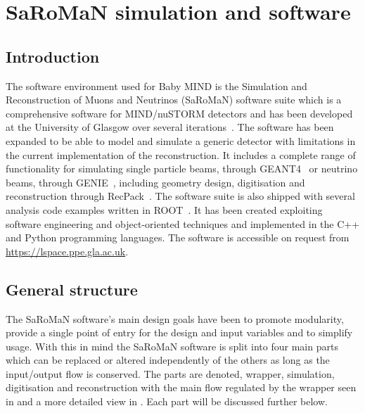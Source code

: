 \chapter{SaRoMaN simulation and software}
\label{c:software}

\section{Introduction}

The software environment used for Baby MIND is the Simulation and Reconstruction of Muons and Neutrinos (SaRoMaN) software suite which is a comprehensive software for MIND/nuSTORM detectors and has been developed at the University of Glasgow over several iterations~\cite{27Bross,  53Laing, 54NUFACT2016Hallsjo}. The software has been expanded to be able to model and simulate a generic detector with limitations in the current implementation of the reconstruction. It includes a complete range of functionality for simulating single particle beams, through GEANT4~\cite{Geant4} or neutrino beams, through GENIE~\cite{Genie}, including geometry design, digitisation and reconstruction through RecPack~\cite{RecPack}. The software suite is also shipped with several analysis code examples written in ROOT~\cite{Root}. It has been created exploiting software engineering and object-oriented techniques and implemented in the C++ and Python programming languages. The software is accessible on request from \url{https://lspace.ppe.gla.ac.uk}. 

\section{General structure}
The SaRoMaN software's main design goals have been to promote modularity, provide a single point of entry for the design and input variables and to simplify usage. With this in mind the SaRoMaN software is split into four main parts which can be replaced or altered independently of the others as long as the input/output flow is conserved. The parts are denoted, wrapper, simulation, digitisation and reconstruction with the main flow regulated by the wrapper seen in  and a more detailed view in . Each part will be discussed further below.

